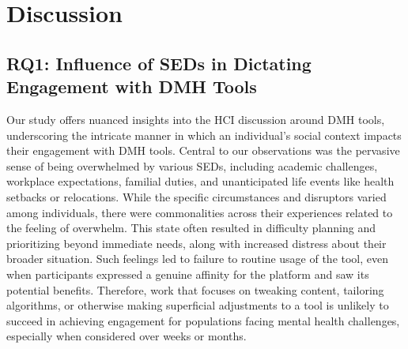 \section{Discussion}



\subsection{RQ1: Influence of SEDs in Dictating Engagement with DMH Tools}


Our study offers nuanced insights into the HCI discussion around DMH tools, underscoring the intricate manner in which an individual's social context impacts their engagement with DMH tools. Central to our observations was the pervasive sense of being overwhelmed by various SEDs, including academic challenges, workplace expectations, familial duties, and unanticipated life events like health setbacks or relocations. While the specific circumstances and disruptors varied among individuals, there were commonalities across their experiences related to the feeling of overwhelm. This state often resulted in difficulty planning and prioritizing beyond immediate needs, along with increased distress about their broader situation. Such feelings led to failure to routine usage of the tool, even when participants expressed a genuine affinity for the platform and saw its potential benefits. Therefore, work that focuses on tweaking content, tailoring algorithms, or otherwise making superficial adjustments to a tool is unlikely to succeed in achieving engagement for populations facing mental health challenges, especially when considered over weeks or months.



